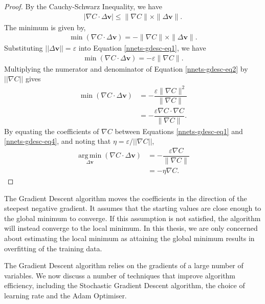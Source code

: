 \begin{proof}
	By the Cauchy-Schwarz Inequality, we have
	\begin{align}
			|\nabla C\cdot\Delta\mathbf{v}| \le \|\nabla C\|\times\|\Delta\mathbf{v}\|.
	\end{align}
	The minimum is given by,
	\begin{align}\label{nnets-gdesc-eq1}
		\min(\nabla C\cdot\Delta\mathbf{v}) = -\|\nabla C\|\times\|\Delta\mathbf{v}\|.
	\end{align}
	Substituting $||\Delta\mathbf{v}|| = \varepsilon$ into Equation 	\eqref{nnets-gdesc-eq1}, we have
	\begin{align}\label{nnets-gdesc-eq2}
		\min(\nabla C\cdot\Delta\mathbf{v}) = -\varepsilon\|\nabla C\|.
	\end{align}
	Multiplying the numerator and denominator of Equation \eqref{nnets-gdesc-eq2} by $||\nabla C||$ gives
	\begin{align}\label{nnets-gdesc-eq3}
		\min(\nabla C\cdot\Delta\mathbf{v}) & = -\dfrac{\varepsilon\|\nabla C\|^2}{\|\nabla C\|}\\[1em]
		& = -\dfrac{\varepsilon\nabla C\cdot\nabla C}{\|\nabla C\|} \label{nnets-gdesc-eq4}.
	\end{align}
	By equating the coefficients of $\nabla C$ between Equations \eqref{nnets-gdesc-eq1} and \eqref{nnets-gdesc-eq4}, and noting that $\eta = \varepsilon / ||\nabla C||$,
	\begin{align*}
		\operatorname*{arg\,min}_{\Delta\mathbf{v}}(\nabla C\cdot\Delta\mathbf{v}) & = -\dfrac{\varepsilon\nabla C}{\|\nabla C\|} \\
		& = -\eta\nabla C.
	\end{align*}	
\end{proof}

The Gradient Descent algorithm moves the coefficients in the direction of the steepest negative gradient. It assumes that the starting values are close enough to the global minimum to converge. If this assumption is not satisfied, the algorithm will instead converge to the local minimum. In this thesis, we are only concerned about estimating the local minimum as attaining the global minimum results in overfitting of the training data.

The Gradient Descent algorithm relies on the gradients of a large number of variables. We now discuss a number of techniques that improve algorithm efficiency, including the Stochastic Gradient Descent algorithm, the choice of learning rate and the Adam Optimiser.


